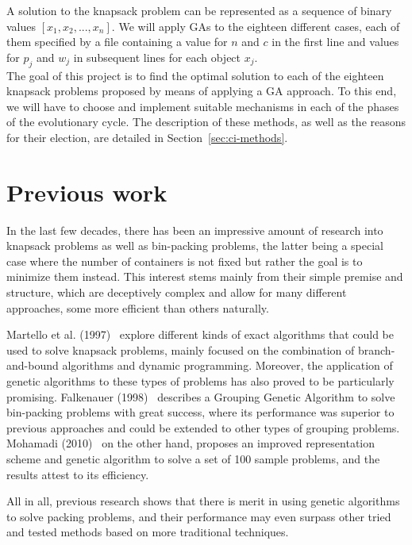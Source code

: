\documentclass[anon]{CI}
\begin{document}
A solution to the knapsack problem can be represented as a sequence of binary values $[x_1, x_2, ..., x_n]$. We will apply GAs to the eighteen different cases, each of them specified by a file containing a value for $n$ and $c$ in the first line and values for $p_j$ and $w_j$ in subsequent lines for each object $x_j$. \\

The goal of this project is to find the optimal solution to each of the eighteen knapsack problems proposed by means of applying a GA approach. To this end, we will have to choose and implement suitable mechanisms in each of the phases of the evolutionary cycle. The description of these methods, as well as the reasons for their election, are detailed in Section~\ref{sec:ci-methods}.

\section{Previous work}

In the last few decades, there has been an impressive amount of research into knapsack problems as well as bin-packing problems, the latter being a special case where the number of containers is not fixed but rather the goal is to minimize them instead. This interest stems mainly from their simple premise and structure, which are deceptively complex and allow for many different approaches, some more efficient than others naturally.

Martello et al. (1997)~\cite{MARTELLO2000325} explore different kinds of exact algorithms that could be used to solve knapsack problems, mainly focused on the combination of branch-and-bound algorithms and dynamic programming. Moreover, the application of genetic algorithms to these types of problems has also proved to be particularly promising. Falkenauer (1998)~\cite{falkenauer1998} describes a Grouping Genetic Algorithm to solve bin-packing problems with great success, where its performance was superior to previous approaches and could be extended to other types of grouping problems. Mohamadi (2010)~\cite{mohamadi2010} on the other hand, proposes an improved representation scheme and genetic algorithm to solve a set of 100 sample problems, and the results attest to its efficiency.

All in all, previous research shows that there is merit in using genetic algorithms to solve packing problems, and their performance may even surpass other tried and tested methods based on more traditional techniques.
\end{document}
